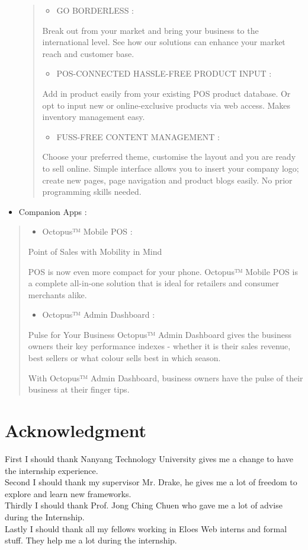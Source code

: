 \documentclass[12pt]{scrartcl}
\begin{document}
\begin{itemize}
\begin{quote}
\begin{itemize}
\item GO BORDERLESS :
\end{itemize}
Break out from your market and bring your business to the international level.
See how our solutions can enhance your market reach and customer base.

\begin{itemize}
\item POS-CONNECTED HASSLE-FREE PRODUCT INPUT :
\end{itemize}
Add in product easily from your existing POS product database. Or opt to input
new or online-exclusive products via web access. Makes inventory management easy.

\begin{itemize}
\item FUSS-FREE CONTENT MANAGEMENT :
\end{itemize}
Choose your preferred theme, customise the layout and you are ready to sell
online. Simple interface allows you to insert your company logo; create new
pages, page navigation and product blogs easily. No prior programming skills needed.
\end{quote}

\item Companion Apps :
\end{itemize}
\begin{quote}
\begin{itemize}
\item Octopus™ Mobile POS :
\end{itemize}
Point of Sales with Mobility in Mind

POS is now even more compact for your phone. Octopus™ Mobile POS is a complete
all-in-one solution that is ideal for retailers and consumer merchants alike.

\begin{itemize}
\item Octopus™ Admin Dashboard :
\end{itemize}
Pulse for Your Business
Octopus™ Admin Dashboard gives the business owners their key performance
indexes - whether it is their sales revenue, best sellers or what colour sells best in which season.

With Octopus™ Admin Dashboard, business owners have the pulse of their business at their finger tips.
\end{quote}

\newpage
\section{Acknowledgment}
\label{sec:org27a8bb0}
First I should thank Nanyang Technology University gives me a change to have
the internship experience. \\
Second I should thank my supervisor Mr. Drake, he gives me a lot of freedom to
explore and learn new frameworks. \\
Thirdly I should thank Prof. Jong Ching Chuen who gave me a lot of advise during
the Internship. \\
Lastly I should thank all my fellows working in Eloes Web interns and formal
stuff. They help me a lot during the internship.
\end{document}

